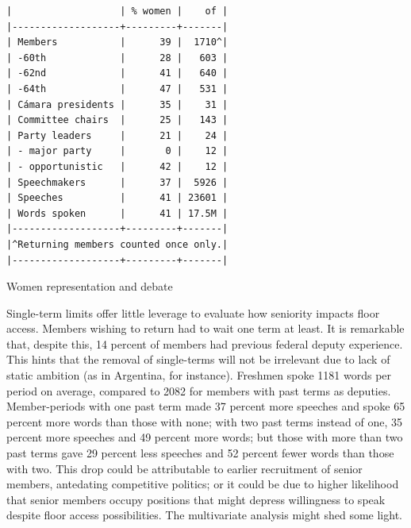 \documentclass[letter,12pt]{article}
\begin{document}
\begin{table}
  \begin{scriptsize}
    \begin{verbatim}
|                   | % women |    of |
|-------------------+---------+-------|
| Members           |      39 |  1710^|
| -60th             |      28 |   603 |
| -62nd             |      41 |   640 |
| -64th             |      47 |   531 |
| Cámara presidents |      35 |    31 |
| Committee chairs  |      25 |   143 |
| Party leaders     |      21 |    24 |
| - major party     |       0 |    12 |
| - opportunistic   |      42 |    12 |
| Speechmakers      |      37 |  5926 |
| Speeches          |      41 | 23601 |
| Words spoken      |      41 | 17.5M |
|-------------------+---------+-------|
|^Returning members counted once only.|
|-------------------+---------+-------|
    \end{verbatim}
  \end{scriptsize}
\caption{Women representation and debate}\label{T:women}
\end{table}


Single-term limits offer little leverage to evaluate how seniority impacts floor access. Members wishing to return had to wait one term at least. It is remarkable that, despite this, 14 percent of members had previous federal deputy experience. This hints that the removal of single-terms will not be irrelevant due to lack of static ambition (as in Argentina, for instance). Freshmen spoke 1181 words per period on average, compared to 2082 for members with past terms as deputies. Member-periods with one past term made 37 percent more speeches and spoke 65 percent more words than those with none; with two past terms instead of one, 35 percent more speeches and 49 percent more words; but those with more than two past terms gave 29 percent less speeches and 52 percent fewer words than those with two. This drop could be attributable to earlier recruitment of senior members, antedating competitive politics; or it could be due to higher likelihood that senior members occupy positions that might depress willingness to speak despite floor access possibilities. The multivariate analysis might shed some light.  
\end{document}
